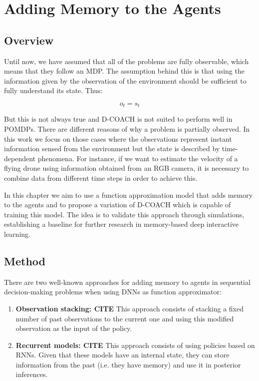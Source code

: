\chapter{Adding Memory to the Agents}
\section{Overview}
Until now, we have assumed that all of the problems are fully observable, which means that they follow an MDP. The assumption behind this is that using the information given by the observation of the environment should be sufficient to fully understand its state. Thus:

\begin{equation}
    o_{t} = s_{t}
\end{equation}

But this is not always true and D-COACH is not suited to perform well in POMDPs. There are different reasons of why a problem is partially observed. In this work we focus on those cases where the observations represent instant information sensed from the environment but the state is described by time-dependent phenomena. For instance, if we want to estimate the velocity of a flying drone using information obtained from an RGB camera, it is necessary to combine data from different time steps in order to achieve this. 

In this chapter we aim to use a function approximation model that adds memory to the agents and to propose a variation of D-COACH which is capable of training this model. The idea is to validate this approach through simulations, establishing a baseline for further research in memory-based deep interactive learning.

\section{Method}
There are two well-known approaches for adding memory to agents in sequential decision-making problems when using DNNs as function approximator:

\begin{enumerate}
    \item \textbf{Observation stacking: \textbf{CITE}} This approach consists of stacking a fixed number of past observations to the current one and using this modified observation as the input of the policy. 
    \item \textbf{Recurrent models: \textbf{CITE}} This approach consists of using policies based on RNNs. Given that these models have an internal state, they can store information from the past (i.e. they have memory) and use it in posterior inferences. 
\end{enumerate}

